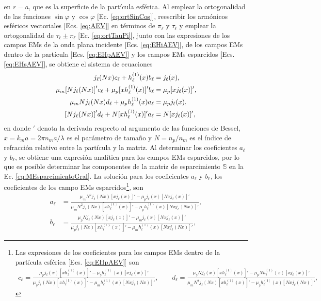 \noindent en $r =a$, que es la superficie de la partícula esférica. Al emplear la ortogonalidad de las funciones $\sin\varphi$ y $\cos\varphi$ [Ec. \eqref{eq:ortSinCos}], reescribir los armónicos esféricos vectoriales [Ecs. \eqref{eq:AEV}] en términos de $\pi_\ell$ y $\tau_\ell$ y emplear la ortogonalidad de $\tau_\ell\pm\pi_\ell$ [Ec. \eqref{eq:ortTauPi}], junto con las expresiones de los campos EMs de la onda plana incidente [Ecs. \eqref{eq:EHiAEV}], de los campos EMs dentro de la partícula [Ecs. \eqref{eq:EHpAEV}] y los campos EMs esparcidos [Ecs. \eqref{eq:EHsAEV}], se obtiene el sistema de ecuaciones
	\begin{align*}
	j_\ell(Nx)c_\ell + h_\ell^{(1)}(x)b_\ell &= j_\ell(x),\\
	\mu_m\qty[Nj_\ell(Nx)]'c_\ell + \mu_p [xh_\ell^{(1)}(x)]'b_\ell &= \mu_p [xj_\ell(x)]',\\
	\mu_m N j_\ell(Nx)d_\ell +\mu_p h_\ell^{(1)}(x)a_\ell &=\mu_p j_\ell(x),\\
	\qty[Nj_\ell(Nx)]'d_\ell + N [xh_\ell^{(1)}(x)]'a_\ell &= N [xj_\ell(x)]',
	\end{align*}
en donde $'$ denota la derivada respecto al argumento de las funciones de Bessel, $x = k_m a = 2 \pi n_m a /\lambda$ es el parámetro de tamaño y $N = n_p / n_m$ es el índice de refracción relativo entre la partícula y la matriz. Al determinar los coeficientes $a_\ell$ y $b_\ell$, se obtiene una expresión analítica para los campos EMs esparcidos, por lo que es posible determinar las componentes de la matriz de esparcimiento $\mathbb{S}$ en la Ec. \eqref{eq:MEsparcimientoGral}. La solución para los coeficientes $a_\ell$ y $b_\ell$, los coeficientes de los campo EMs esparcidos\footnote{Las expresiones de los coeficientes para los campos EMs dentro de la partícula esférica [Ecs. \eqref{eq:EHpAEV}] son 
	\begin{align*}
	c_\ell = \frac{\mu_p j_\ell(x)[xh_\ell^{(1)}(x)]' - \mu_p h_\ell^{(1)}(x) [xj_\ell(x)]'}
				{\mu_pj_\ell(Nx) [xh_\ell^{(1)}(x)]'-\mu_m h_\ell^{(1)}(x) [N x j_\ell(Nx)]' },
	\qquad	
	d_\ell = \frac{\mu_p N j_\ell(x)[xh_\ell^{(1)}(x)]' - \mu_p N h_\ell^{(1)}(x) [xj_\ell(x)]'}
				{\mu_m N^2 j_\ell(Nx) [xh_\ell^{(1)}(x)]'-\mu_p h_\ell^{(1)}(x) [N x j_\ell(Nx)]' }	,
	\end{align*}}, son 
	\begin{subequations}\begin{align}
	a_\ell &= \frac{\mu_m N^2 j_\ell(Nx)[xj_\ell(x)]' - \mu_p j_\ell(x) [Nxj_\ell(x)]'}
				{\mu_mN^2j_\ell(Nx) [xh_\ell^{(1)}(x)]'-\mu_p h_\ell^{(1)}(x) [N x j_\ell(Nx)]' },
	\label{eq:a_ellFULL}\\
	b_\ell &= \frac{\mu_p N j_\ell(Nx)[xj_\ell(x)]' - \mu_m j_\ell(x) [Nxj_\ell(x)]'}
				{\mu_p j_\ell(Nx) [xh_\ell^{(1)}(x)]'-\mu_m h_\ell^{(1)}(x) [N x j_\ell(Nx)]' },
	\label{eq:b_ellFULL}			
	\end{align}\label{eq:MieCoefScattFULL}\end{subequations}
